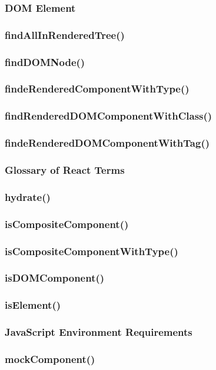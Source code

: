 \documentclass{book}
\begin{document}
\begin{CJK*}{UTF8}{gbsn}
\subsubsection{DOM Element}
\subsubsection{findAllInRenderedTree()}
\subsubsection{findDOMNode()}
\subsubsection{findeRenderedComponentWithType()}
\subsubsection{findRenderedDOMComponentWithClass()}
\subsubsection{findeRenderedDOMComponentWithTag()}
\subsubsection{Glossary of React Terms}
\subsubsection{hydrate()}
\subsubsection{isCompositeComponent()}
\subsubsection{isCompositeComponentWithType()}
\subsubsection{isDOMComponent()}
\subsubsection{isElement()}
\subsubsection{JavaScript Environment Requirements}
\subsubsection{mockComponent()}

\end{CJK*}
\end{document}
